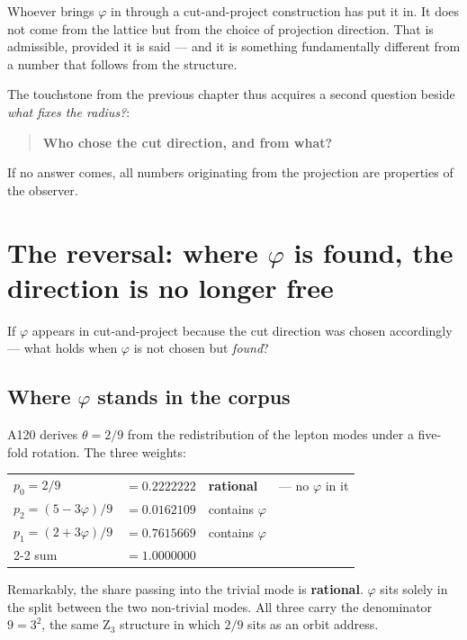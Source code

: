 \documentclass[11pt]{report}
\begin{document}
Whoever brings $\varphi$ in through a cut-and-project construction has
put it in. It does not come from the lattice but from the choice of
projection direction. That is admissible, provided it is said --- and
it is something fundamentally different from a number that follows from
the structure.

The touchstone from the previous chapter thus acquires a second
question beside \emph{what fixes the radius?}:

\begin{quote}
\textbf{Who chose the cut direction, and from what?}
\end{quote}

If no answer comes, all numbers originating from the projection are
properties of the observer.

\chapter{The reversal: where \texorpdfstring{$\varphi$}{phi} is found,
the direction is no longer free}

If $\varphi$ appears in cut-and-project because the cut direction was
chosen accordingly --- what holds when $\varphi$ is not chosen but
\emph{found}?

\section{Where \texorpdfstring{$\varphi$}{phi} stands in the corpus}

A120 derives $\theta = 2/9$ from the redistribution of the lepton modes
under a five-fold rotation. The three weights:
\begin{center}
\begin{tabular}{llll}
$p_0 = 2/9$ & $= 0.2222222$ & \textbf{rational} & --- no $\varphi$ in it \\
$p_2 = (5 - 3\varphi)/9$ & $= 0.0162109$ & contains $\varphi$ & \\
$p_1 = (2 + 3\varphi)/9$ & $= 0.7615669$ & contains $\varphi$ & \\
\cmidrule{2-2}
sum & $= 1.0000000$ & & \\
\end{tabular}
\end{center}

Remarkably, the share passing into the trivial mode is
\textbf{rational}. $\varphi$ sits solely in the split between the two
non-trivial modes. All three carry the denominator $9 = 3^2$, the same
Z$_3$ structure in which $2/9$ sits as an orbit address.
\end{document}
